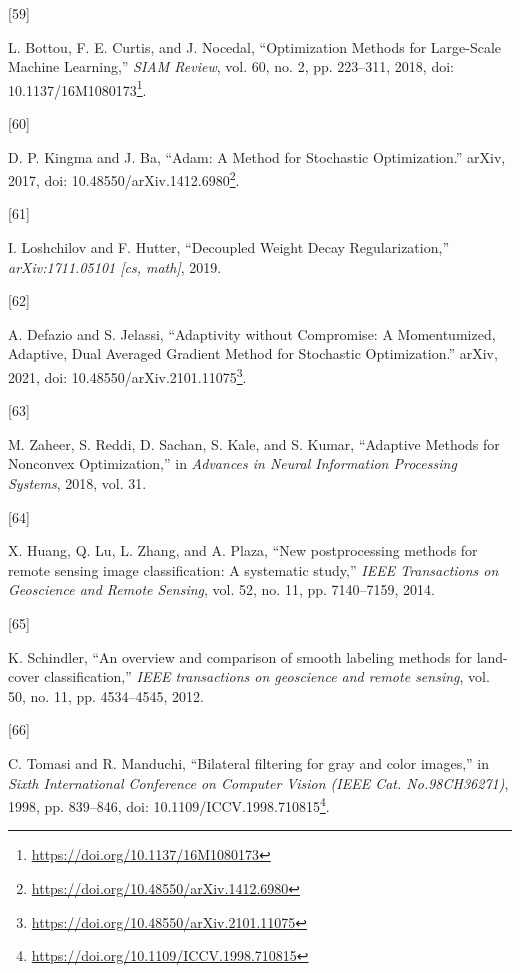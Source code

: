 \documentclass[
  11pt,
]{report}
\newlength{\cslhangindent}
\newlength{\csllabelwidth}
\newlength{\cslentryspacingunit} %
\newenvironment{CSLReferences}[2] %
 {%
  \setlength{\parindent}{0pt}
  \ifodd #1
  \let\oldpar\par
  \def\par{\hangindent=\cslhangindent\oldpar}
  \fi
  \setlength{\parskip}{#2\cslentryspacingunit}
 }%
 {}
\newcommand{\CSLLeftMargin}[1]{\parbox[t]{\csllabelwidth}{#1}}
\newcommand{\CSLRightInline}[1]{\parbox[t]{\linewidth - \csllabelwidth}{#1}\break}
\renewcommand{\href}[2]{#2\footnote{\url{#1}}}
\begin{document}
\begin{CSLReferences}{0}{0}
\leavevmode{}%
\CSLLeftMargin{{[}59{]} }%
\CSLRightInline{L. Bottou, F. E. Curtis, and J. Nocedal, {``Optimization
{Methods} for {Large-Scale Machine Learning},''} \emph{SIAM Review},
vol. 60, no. 2, pp. 223--311, 2018, doi:
\href{https://doi.org/10.1137/16M1080173}{10.1137/16M1080173}.}

\leavevmode{}%
\CSLLeftMargin{{[}60{]} }%
\CSLRightInline{D. P. Kingma and J. Ba, {``Adam: {A Method} for
{Stochastic Optimization}.''} {arXiv}, 2017, doi:
\href{https://doi.org/10.48550/arXiv.1412.6980}{10.48550/arXiv.1412.6980}.}

\leavevmode{}%
\CSLLeftMargin{{[}61{]} }%
\CSLRightInline{I. Loshchilov and F. Hutter, {``Decoupled {Weight Decay
Regularization},''} \emph{arXiv:1711.05101 {[}cs, math{]}}, 2019.}

\leavevmode{}%
\CSLLeftMargin{{[}62{]} }%
\CSLRightInline{A. Defazio and S. Jelassi, {``Adaptivity without
{Compromise}: {A Momentumized}, {Adaptive}, {Dual Averaged Gradient
Method} for {Stochastic Optimization}.''} {arXiv}, 2021, doi:
\href{https://doi.org/10.48550/arXiv.2101.11075}{10.48550/arXiv.2101.11075}.}

\leavevmode{}%
\CSLLeftMargin{{[}63{]} }%
\CSLRightInline{M. Zaheer, S. Reddi, D. Sachan, S. Kale, and S. Kumar,
{``Adaptive {Methods} for {Nonconvex Optimization},''} in \emph{Advances
in {Neural Information Processing Systems}}, 2018, vol. 31.}

\leavevmode{}%
\CSLLeftMargin{{[}64{]} }%
\CSLRightInline{X. Huang, Q. Lu, L. Zhang, and A. Plaza, {``New
postprocessing methods for remote sensing image classification: {A}
systematic study,''} \emph{IEEE Transactions on Geoscience and Remote
Sensing}, vol. 52, no. 11, pp. 7140--7159, 2014.}

\leavevmode{}%
\CSLLeftMargin{{[}65{]} }%
\CSLRightInline{K. Schindler, {``An overview and comparison of smooth
labeling methods for land-cover classification,''} \emph{IEEE
transactions on geoscience and remote sensing}, vol. 50, no. 11, pp.
4534--4545, 2012.}

\leavevmode{}%
\CSLLeftMargin{{[}66{]} }%
\CSLRightInline{C. Tomasi and R. Manduchi, {``Bilateral filtering for
gray and color images,''} in \emph{Sixth {International Conference} on
{Computer Vision} ({IEEE Cat}. {No}.{98CH36271})}, 1998, pp. 839--846,
doi:
\href{https://doi.org/10.1109/ICCV.1998.710815}{10.1109/ICCV.1998.710815}.}


\end{CSLReferences}
\end{document}
